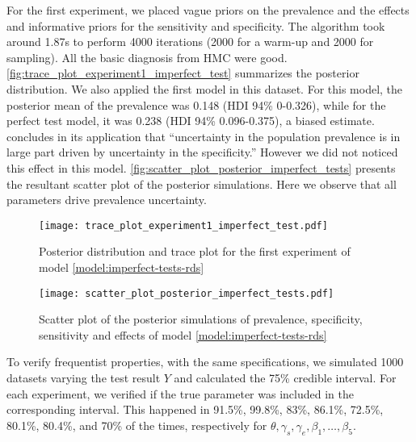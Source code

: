 For the first experiment, we placed vague priors on the prevalence and the
effects and informative priors for the sensitivity and specificity. The
algorithm took around 1.87s to perform 4000 iterations  (2000 for a warm-up
and 2000 for sampling). All the basic diagnosis from HMC were good.
\autoref{fig:trace_plot_experiment1_imperfect_test} summarizes the posterior
distribution. We also applied the first model in this dataset. For this model,
the posterior mean of the prevalence was 0.148 (HDI 94\% 0-0.326), while for
the perfect test model, it was 0.238 (HDI 94\% 0.096-0.375), a biased
estimate. \textcite[p. 1271]{gelman2020bayesian} concludes in its application
that ``uncertainty in the population prevalence is in large part driven by
uncertainty in the specificity.'' However we did not noticed this effect in
this model. \autoref{fig:scatter_plot_posterior_imperfect_tests} presents the
resultant scatter plot of the posterior simulations. Here we observe that all
parameters drive prevalence uncertainty.

\begin{figure}[ht]
  \centering
  \caption{\label{fig:trace_plot_experiment1_imperfect_test}Posterior distribution
    and trace plot for the first experiment of model
    \eqref{model:imperfect-tests-rds}}
  \texttt{[image: trace\_plot\_experiment1\_imperfect\_test.pdf]}
\end{figure}

\begin{figure}[ht]
  \centering
  \caption{\label{fig:scatter_plot_posterior_imperfect_tests} Scatter plot of
    the posterior simulations of prevalence, specificity, sensitivity and effects of model
    \eqref{model:imperfect-tests-rds}}
  \texttt{[image: scatter\_plot\_posterior\_imperfect\_tests.pdf]}
\end{figure}

To verify frequentist properties, with the same specifications,
we simulated 1000 datasets varying the test result $Y$ and calculated the
75\% credible interval. For each experiment, we
verified if the true parameter was included in the corresponding interval.
This happened in 91.5\%, 99.8\%, 83\%, 86.1\%, 72.5\%, 80.1\%, 80.4\%, and 70\% of the
times, respectively for $\theta, \gamma_s, \gamma_e, \beta_1, \dots, \beta_5$.

